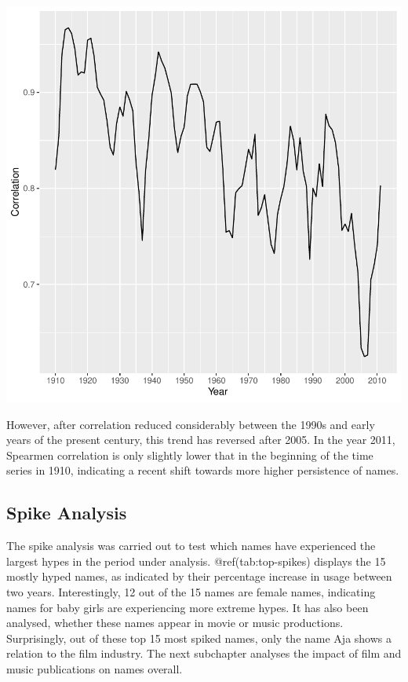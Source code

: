 \documentclass[11pt,preprint]{elsarticle}
\let\origfigure\figure
\let\endorigfigure\endfigure
\renewenvironment{figure}[1][2] {
    \expandafter\origfigure\expandafter[H]
} {
    \endorigfigure
}
\numberwithin{equation}{section}
\numberwithin{figure}{section}
\numberwithin{table}{section}
\begin{document}
\begin{figure}[H]

{\centering \includegraphics{Task_1_ReadMe_files/figure-latex/fig-correlation-1} 

}

\caption{Correlation Trend Over Time (1910–2011)}\label{fig:fig-correlation}
\end{figure}

However, after correlation reduced considerably between the 1990s and
early years of the present century, this trend has reversed after 2005.
In the year 2011, Spearmen correlation is only slightly lower that in
the beginning of the time series in 1910, indicating a recent shift
towards more higher persistence of names.

\subsection{Spike Analysis}\label{spike-analysis}

The spike analysis was carried out to test which names have experienced
the largest hypes in the period under analysis. @ref(tab:top-spikes)
displays the 15 mostly hyped names, as indicated by their percentage
increase in usage between two years. Interestingly, 12 out of the 15
names are female names, indicating names for baby girls are experiencing
more extreme hypes. It has also been analysed, whether these names
appear in movie or music productions. Surprisingly, out of these top 15
most spiked names, only the name Aja shows a relation to the film
industry. The next subchapter analyses the impact of film and music
publications on names overall.
\end{document}

